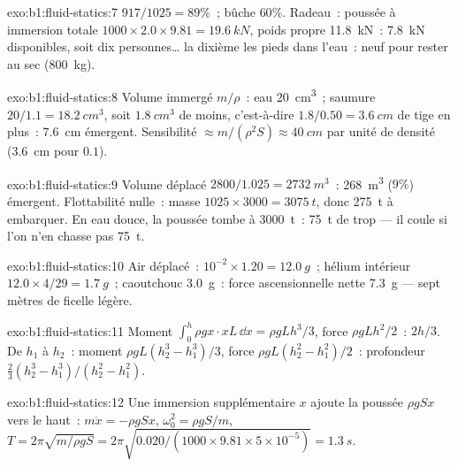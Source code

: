\begin{solution}{exo:b1:fluid-statics:7}
$917/1025 = 89\%$~; bûche $60\%$. Radeau~: poussée à immersion totale $1000 \times
2.0 \times 9.81 = \qty{19.6}{kN}$, poids propre \qty{11.8}{kN}~: \qty{7.8}{kN}
disponibles, soit dix personnes\dots{} la dixième les pieds dans l'eau~: neuf pour rester au sec
(\qty{800}{kg}).
\end{solution}

\begin{solution}{exo:b1:fluid-statics:8}
Volume immergé $m/\rho$~: eau \qty{20}{cm^3}~; saumure $20/1.1 = \qty{18.2}{cm^3}$,
soit $\qty{1.8}{cm^3}$ de moins, c'est-à-dire $1.8/0.50 = \qty{3.6}{cm}$ de tige en plus~: \qty{7.6}{cm}
émergent. Sensibilité $\approx m/(\rho^2S) \approx \qty{40}{cm}$ par unité de densité
(\qty{3.6}{cm} pour $0.1$).
\end{solution}

\begin{solution}{exo:b1:fluid-statics:9}
Volume déplacé $2800/1.025 = \qty{2732}{m^3}$~: \qty{268}{m^3} ($9\%$)
émergent. Flottabilité nulle~: masse $1025 \times 3000 = \qty{3075}{t}$, donc \qty{275}{t}
à embarquer. En eau douce, la poussée tombe à \qty{3000}{t}~: \qty{75}{t} de trop --- il coule
si l'on n'en chasse pas \qty{75}{t}.
\end{solution}

\begin{solution}{exo:b1:fluid-statics:10}
Air déplacé~: $10^{-2} \times 1.20 = \qty{12.0}{g}$~; hélium intérieur $12.0 \times
4/29 = \qty{1.7}{g}$~; caoutchouc \qty{3.0}{g}~: force ascensionnelle nette \qty{7.3}{g} --- sept mètres
de ficelle légère.
\end{solution}

\begin{solution}{exo:b1:fluid-statics:11}
Moment $\int_0^h\rho gx\cdot xL\,\dd x = \rho gLh^3/3$, force $\rho gLh^2/2$~:
 $2h/3$. De $h_1$ à $h_2$~: moment $\rho gL(h_2^3 - h_1^3)/3$, force
$\rho gL(h_2^2 - h_1^2)/2$~: profondeur $\frac23(h_2^3 - h_1^3)/(h_2^2 - h_1^2)$.
\end{solution}

\begin{solution}{exo:b1:fluid-statics:12}
Une immersion supplémentaire $x$ ajoute la poussée $\rho gSx$ vers le haut~: $m\ddot x = -\rho gSx$,
$\omega_0^2 = \rho gS/m$, $T = 2\pi\sqrt{m/\rho gS} = 2\pi\sqrt{0.020/(1000 \times
9.81 \times 5\times10^{-5})} = \qty{1.3}{s}$.
\end{solution}

